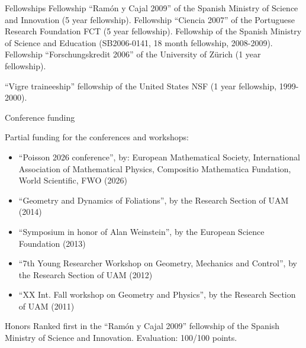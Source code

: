 \documentclass[12p]{resume}
\begin{document}
\begin{category}{Fellowships}
\citemnobullet  Fellowship ``Ram\'on y Cajal 2009''  of the Spanish Ministry of Science and Innovation (5 year fellowship).  
\citemnobullet  Fellowship ``Ciencia 2007'' of the Portuguese Research Foundation FCT (5 year fellowship).
\citemnobullet
Fellowship  of the Spanish Ministry of Science and Education (SB2006-0141, 18 month fellowship, 2008-2009). 
\citemnobullet
Fellowship ``Forschungskredit 2006''  of
  the University of Z\"urich (1 year fellowship).

\citemnobullet  
``Vigre traineeship''  fellowship of the United States NSF (1 year fellowship, 1999-2000).
\end{category}



\begin{category}{Conference funding}

\citemnobullet Partial funding for the conferences and workshops:
 
 
 \begin{itemize}
 
 \item  ``Poisson 2026 conference'', by: European Mathematical Society, International Association of Mathematical Physics, Compositio Mathematica Fundation,  
World Scientific, FWO (2026)
 
\item ``Geometry and Dynamics of Foliations'',   by the Research Section of UAM (2014)

\item ``Symposium in honor of Alan Weinstein'',   by the European Science Foundation  (2013) 

\item ``7th
Young Researcher Workshop on Geometry, Mechanics and Control'',  by the Research Section of UAM (2012)

\item ``XX Int. Fall workshop on Geometry and Physics'', by the Research Section of UAM (2011)
\end{itemize}

 
\end{category}

\begin{category}{Honors}
 \citemnobullet Ranked first in the ``Ram\'on y Cajal 2009'' fellowship of the Spanish Ministry of Science and Innovation.  Evaluation: 100/100 points.
\end{category}
\end{document}
